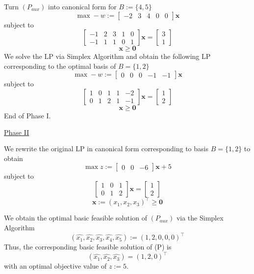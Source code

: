 \begin{exbox}
\begin{example}
        Turn $ (P_{aux}) $ into canonical form for $ B:=\{4,5\} $
        \[\max -w:=\begin{bmatrix} -2 & 3 & 4 & 0 & 0 \end{bmatrix} \bm{x} \]
        subject to
        \[
            \begin{bmatrix}
                -1 & 2 & 3 & 1 & 0 \\
                -1 & 1 & 1 & 0 & 1
            \end{bmatrix}
            \bm{x}=
            \begin{bmatrix}
                3 \\
                1
            \end{bmatrix}
        \]
        \[ \bm{x}\geqslant  \bm{0} \]
        We solve the LP via Simplex Algorithm and obtain the following
        LP corresponding to the optimal basis of $ B=\{1,2\} $
        \[\max -w:=\begin{bmatrix} 0 & 0 & 0 & -1 & -1 \end{bmatrix} \bm{x} \]
        subject to
        \[
            \begin{bmatrix}
                1 & 0 & 1 & 1 & -2 \\
                0 & 1 & 2 & 1 & -1
            \end{bmatrix}
            \bm{x}=
            \begin{bmatrix}
                1 \\
                2
            \end{bmatrix}
        \]
        \[ \bm{x}\geqslant  \bm{0} \]
        End of Phase I.

        \underline{Phase II}

        We rewrite the original LP in canonical form corresponding
        to basis $ B=\{1,2\} $ to obtain
        \[ \max z:= \begin{bmatrix}0 & 0 & -6 \end{bmatrix}\bm{x}+5 \]
        subject to
        \[ \begin{bmatrix}
                1 & 0 & 1 \\
                0 & 1 & 2
            \end{bmatrix}\bm{x}=
            \begin{bmatrix}
                1 \\
                2
            \end{bmatrix} \]
        \[ \bm{x}:=(x_1,x_2,x_3)^\top\geqslant  \bm{0} \]

        We obtain the optimal basic feasible solution of $ (P_{aux}) $ via the Simplex
        Algorithm
        \[(\hat{x_1}, \hat{x_2}, \hat{x_3}, \hat{x_4}, \hat{x_5}):=
            (1,2,0,0,0)^\top\]
        Thus, the corresponding basic feasible solution of (P) is
        \[(\hat{x_1}, \hat{x_2}, \hat{x_3})=(1,2,0)^\top\]
        with an optimal objective value of $ z:= 5 $.
    \end{example}
\end{exbox}

